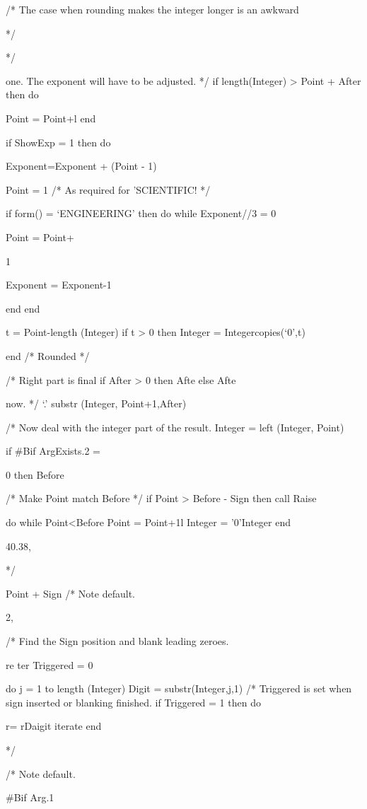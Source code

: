 /* The case when rounding makes the integer longer is an awkward

*/

*/

one. The exponent will have to be adjusted. */ if length(Integer)
\textgreater{} Point + After then do

Point = Point+l end

if ShowExp = 1 then do

Exponent=Exponent + (Point - 1)

Point = 1 /* As required for 'SCIENTIFIC! */

if form() = `ENGINEERING' then do while Exponent//3 = 0

Point = Point+

1

Exponent = Exponent-1

end end

t = Point-length (Integer) if t \textgreater{} 0 then Integer =
Integer\textbar\textbar copies(`0',t)

end /* Rounded */

/* Right part is final if After \textgreater{} 0 then Afte else Afte

now. */ `.'\textbar{} \textbar substr (Integer, Point+1,After)

/* Now deal with the integer part of the result. Integer = left
(Integer, Point)

if \#Bif ArgExists.2 =

0 then Before

/* Make Point match Before */ if Point \textgreater{} Before - Sign then
call Raise

do while Point\textless Before Point = Point+1l Integer = '0'Integer end

40.38,

*/

Point + Sign /* Note default.

2,

/* Find the Sign position and blank leading zeroes.

re ter Triggered = 0

do j = 1 to length (Integer) Digit = substr(Integer,j,1) /* Triggered is
set when sign inserted or blanking finished. if Triggered = 1 then do

r= r\textbar\textbar Daigit iterate end

*/

/* Note default.

\#Bif Arg.1

